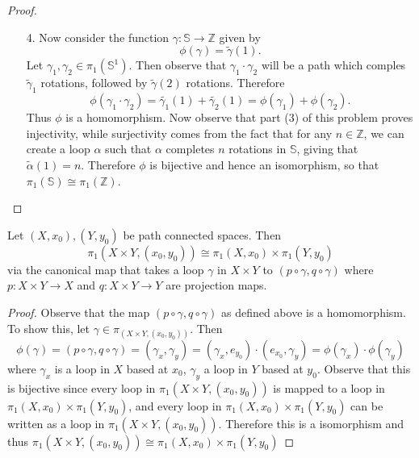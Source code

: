 \documentclass[a4paper,12pt,twoside]{hmcpset}
\begin{document}
\begin{proof}
\begin{itemize}
        \item[4.] Now consider the function $\gamma: \mathbb{S} \to
        \mathbb{Z}$ given by 
        \[
            \phi(\gamma) = \tilde{\gamma}(1).
        \]
        Let $\gamma_1, \gamma_2 \in \pi_1(\mathbb{S}^1)$. Then
        observe that $\gamma_1 \cdot \gamma_2$ will be a path
        which comples $\tilde{\gamma}_1$ rotations, followed by
        $\tilde{\gamma}(2)$ rotations. Therefore 
        \[
           \phi(\gamma_1 \cdot \gamma_2)
           = \tilde{\gamma_1}(1) + \tilde{\gamma_2}(1) = \phi(\gamma_1) + \phi(\gamma_2).
        \]
        Thus $\phi$ is a homomorphism. Now observe that part (3)
        of this problem proves injectivity, while surjectivity
        comes from the fact that for any $n \in \mathbb{Z}$, we
        can create a loop $\alpha$ such that $\alpha$ completes
        $n$ rotations in $\mathbb{S}$, giving that
        $\tilde{\alpha}(1) = n$. Therefore $\phi$ is bijective and
        hence an isomorphism, so that $\pi_1(\mathbb{S}) \cong \pi_1(\mathbb{Z})$.
        
    \end{itemize}

\end{proof}

\begin{problem}[Theorem 13.15]
    Let $(X, x_0), (Y, y_0)$ be path connected spaces. Then 
    \[
        \pi_1(X \times Y, (x_0, y_0)) \cong \pi_1(X, x_0) \times \pi_1(Y, y_0)
    \]
    via the canonical map that takes a loop $\gamma$ in $X \times Y$
    to $(p \circ \gamma, q \circ \gamma)$ where $p: X \times Y \to X$
    and $q : X \times Y \to Y$ are projection maps. 
\end{problem}

\begin{proof}
    Observe that the map $(p \circ \gamma, q \circ \gamma)$ as defined
    above is a homomorphism. To show this, let $\gamma \in \pi_(X
    \times Y, (x_0, y_0))$. Then 
    \[
        \phi(\gamma) = (p \circ \gamma, q \circ \gamma) = (\gamma_x, \gamma_y) =
        (\gamma_x, e_{y_0}) \cdot (e_{x_0}, \gamma_y) = \phi(\gamma_x)\cdot\phi(\gamma_y)
    \]
    where $\gamma_x$ is a loop in $X$ based at $x_0$, $\gamma_y$ a
    loop in $Y$ based at $y_0$. Observe that this is bijective since
    every loop in $\pi_1(X \times Y, (x_0, y_0))$ is mapped to a loop
    in $\pi_1(X, x_0) \times \pi_1(Y, y_0)$, and every loop in
    $\pi_1(X, x_0) \times \pi_1(Y, y_0)$ can be written as a loop in 
    $\pi_1(X \times Y, (x_0, y_0))$. Therefore this is a isomorphism
    and thus $\pi_1(X \times Y, (x_0, y_0)) \cong \pi_1(X, x_0) \times \pi_1(Y, y_0)$
\end{proof}
\end{document}
